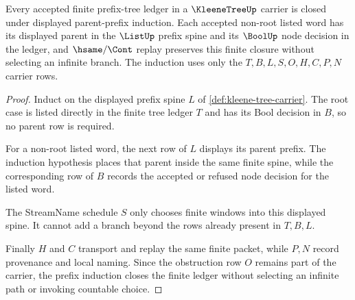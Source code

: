 \begin{theorem}
\label{thm:kleene-tree-prefix-induction-closure}
Every accepted finite prefix-tree ledger in a $\KleeneTreeUp$ carrier is closed under displayed parent-prefix induction. Each accepted non-root listed word has its displayed parent in the $\ListUp$ prefix spine and its $\BoolUp$ node decision in the ledger, and $\hsame/\Cont$ replay preserves this finite closure without selecting an infinite branch. The induction uses only the $T,B,L,S,O,H,C,P,N$ carrier rows.
\end{theorem}
\begin{proof}
Induct on the displayed prefix spine $L$ of \autoref{def:kleene-tree-carrier}. The root case is listed directly in the finite tree ledger $T$ and has its Bool decision in $B$, so no parent row is required.

For a non-root listed word, the next row of $L$ displays its parent prefix. The induction hypothesis places that parent inside the same finite spine, while the corresponding row of $B$ records the accepted or refused node decision for the listed word.

The StreamName schedule $S$ only chooses finite windows into this displayed spine. It cannot add a branch beyond the rows already present in $T,B,L$.

Finally $H$ and $C$ transport and replay the same finite packet, while $P,N$ record provenance and local naming. Since the obstruction row $O$ remains part of the carrier, the prefix induction closes the finite ledger without selecting an infinite path or invoking countable choice.
\end{proof}

